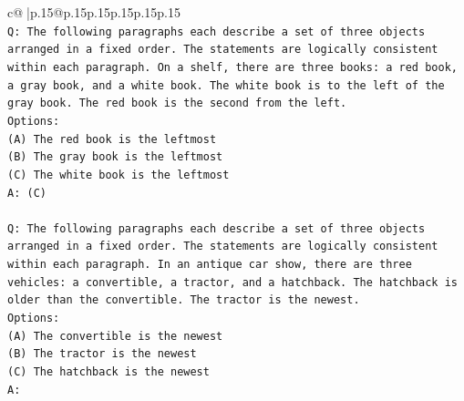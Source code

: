 \documentclass{article}
\begin{document}
{\begin{supertabular}{c@{$\;$}|p{.15\linewidth}@{}p{.15\linewidth}p{.15\linewidth}p{.15\linewidth}p{.15\linewidth}p{.15\linewidth}}
{{{\\ 
\texttt{Q: The following paragraphs each describe a set of three objects arranged in a fixed order. The statements are logically consistent within each paragraph. On a shelf, there are three books: a red book, a gray book, and a white book. The white book is to the left of the gray book. The red book is the second from the left.} \\
\texttt{Options:} \\
\texttt{(A) The red book is the leftmost} \\
\texttt{(B) The gray book is the leftmost} \\
\texttt{(C) The white book is the leftmost} \\
\texttt{A: (C)} \\
\\ 
\texttt{Q: The following paragraphs each describe a set of three objects arranged in a fixed order. The statements are logically consistent within each paragraph. In an antique car show, there are three vehicles: a convertible, a tractor, and a hatchback. The hatchback is older than the convertible. The tractor is the newest.} \\
\texttt{Options:} \\
\texttt{(A) The convertible is the newest} \\
\texttt{(B) The tractor is the newest} \\
\texttt{(C) The hatchback is the newest} \\
\texttt{A:} \\
            }
        }
    }
     \\ \\


\end{supertabular}}
\end{document}
